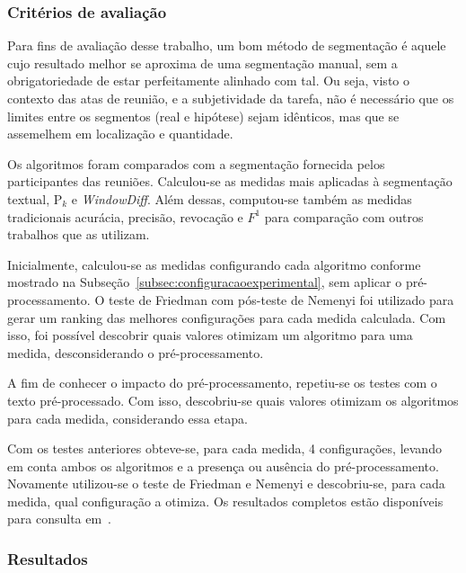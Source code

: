 \cite{Naili2016}
\cite{Ferret2009}

\subsubsection{Critérios de avaliação}

Para fins de avaliação desse trabalho, um bom método de segmentação é aquele cujo resultado melhor se aproxima de uma segmentação manual, sem a obrigatoriedade de estar perfeitamente alinhado com tal. Ou seja, visto o contexto das atas de reunião, e a subjetividade da tarefa, não é necessário que os limites entre os segmentos (real e hipótese) sejam idênticos, mas que se assemelhem em localização e quantidade.


Os algoritmos foram comparados com a segmentação fornecida pelos participantes das reuniões. Calculou-se as medidas mais aplicadas à segmentação textual, P$_k$ e \textit{WindowDiff}. Além dessas, computou-se também as medidas tradicionais acurácia, precisão, revocação e $F^1$ para comparação com outros trabalhos que as utilizam.

Inicialmente, calculou-se as medidas configurando cada algoritmo conforme mostrado na Subseção~\ref{subsec:configuracaoexperimental}, sem aplicar o pré-processamento. O teste de Friedman com pós-teste de Nemenyi foi utilizado para gerar um ranking das melhores configurações para cada medida calculada. Com isso, foi possível descobrir quais valores otimizam um algoritmo para uma medida, 	desconsiderando o pré-processamento. 

A fim de conhecer o impacto do pré-processamento, repetiu-se os testes com o texto pré-processado. Com isso, descobriu-se quais valores otimizam os algoritmos para cada medida, considerando essa etapa.

Com os testes anteriores obteve-se, para cada medida, 4 configurações, levando em conta ambos os algoritmos e a presença ou ausência do pré-processamento. Novamente utilizou-se o teste de Friedman e Nemenyi e descobriu-se, para cada medida, qual configuração a otimiza. Os resultados completos estão disponíveis para consulta em~\urlsoftwares.




\subsubsection{Resultados}


